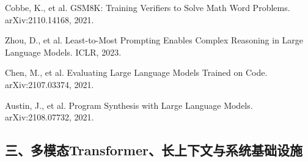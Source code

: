 \documentclass[12pt,a4paper]{article}
\begin{document}
\begin{enumerate}[label={[\arabic*]}, resume]
    \item Cobbe, K., et al. GSM8K: Training Verifiers to Solve Math Word Problems. arXiv:2110.14168, 2021.

    \item Zhou, D., et al. Least-to-Most Prompting Enables Complex Reasoning in Large Language Models. ICLR, 2023.

    \item Chen, M., et al. Evaluating Large Language Models Trained on Code. arXiv:2107.03374, 2021.

    \item Austin, J., et al. Program Synthesis with Large Language Models. arXiv:2108.07732, 2021.
\end{enumerate}

\subsection*{三、多模态Transformer、长上下文与系统基础设施}
\end{document}
